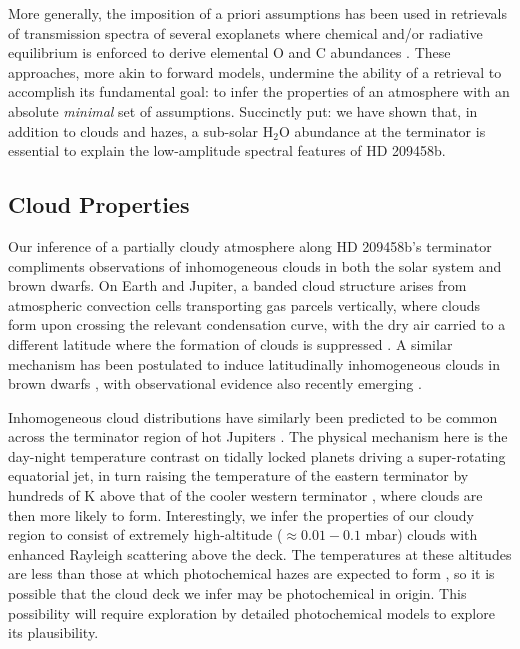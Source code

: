 \documentclass[fleqn,usenatbib]{mnras}
\begin{document}
More generally, the imposition of a priori assumptions has been used in retrievals of transmission spectra of several exoplanets where chemical and/or radiative equilibrium is enforced to derive elemental O and C abundances \citep[e.g.,][]{Benneke2015,Kreidberg2015}. These approaches, more akin to forward models, undermine the ability of a retrieval to accomplish its fundamental goal: to infer the properties of an atmosphere with an absolute \emph{minimal} set of assumptions. Succinctly put: we have shown that, in addition to clouds and hazes, a sub-solar $\mathrm{H_{2}O}$ abundance at the terminator is essential to explain the low-amplitude spectral features of HD 209458b. 

\subsection{Cloud Properties}

Our inference of a partially cloudy atmosphere along HD 209458b's terminator compliments observations of inhomogeneous clouds in both the solar system and brown dwarfs. On Earth and Jupiter, a banded cloud structure arises from atmospheric convection cells transporting gas parcels vertically, where clouds form upon crossing the relevant condensation curve, with the dry air carried to a different latitude where the formation of clouds is suppressed \citep{depater2001}. A similar mechanism has been postulated to induce latitudinally inhomogeneous clouds in brown dwarfs \citep[e.g.,][]{Marley2010}, with observational evidence also recently emerging \citep[e.g.,][]{Buenzli2012}.

Inhomogeneous cloud distributions have similarly been predicted to be common across the terminator region of hot Jupiters \citep{Parmentier2016}. The physical mechanism here is the day-night temperature contrast on tidally locked planets driving a super-rotating equatorial jet, in turn raising the temperature of the eastern terminator by hundreds of K above that of the cooler western terminator \citep{Showman2002}, where clouds are then more likely to form. Interestingly, we infer the properties of our cloudy region to consist of extremely high-altitude ($\approx 0.01-0.1$ mbar) clouds with enhanced Rayleigh scattering above the deck. The temperatures at these altitudes are less than those at which photochemical hazes are expected to form \citep[$\sim 1000-1100$ K, see][]{Zahnle2009,Moses2014}, so it is possible that the cloud deck we infer may be photochemical in origin. This possibility will require exploration by detailed photochemical models to explore its plausibility.
\end{document}

